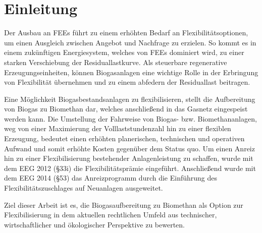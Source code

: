 \section{Einleitung}

Der Ausbau an \glspl{FEE} führt zu einem erhöhten Bedarf an Flexibilitätsoptionen, um einen Ausgleich zwischen Angebot und Nachfrage zu erzielen. So kommt es in einem zukünftigen Energiesystem, welches von \glspl{FEE} dominiert wird, zu einer starken Verschiebung der Residuallastkurve. Als steuerbare regenerative Erzeugungseinheiten, können Biogasanlagen eine wichtige Rolle in der Erbringung von Flexibilität übernehmen und zu einem abfedern der Residuallast beitragen. \parencite{ISE2013}\smallskip

Eine Möglichkeit Biogasbestandsanlagen zu flexibilisieren, stellt die Aufbereitung von Biogas zu Biomethan dar, welches anschließend in das Gasnetz eingespeist werden kann. Die Umstellung der Fahrweise von Biogas- bzw. Biomethananlagen, weg von einer Maximierung der Volllaststundenzahl hin zu einer flexiblen Erzeugung, bedeutet einen erhöhten planerischen, technischen und operativen Aufwand und somit erhöhte Kosten gegenüber dem Status quo. Um einen Anreiz hin zu einer Flexibilisierung bestehender Anlagenleistung zu schaffen, wurde mit dem \gls{EEG} 2012 (\S 33i) die Flexibilitätsprämie eingeführt. Anschließend wurde mit dem \gls{EEG} 2014 (\S 53) das Anreizprogramm durch die Einführung des Flexibilitätszuschlages auf Neuanlagen ausgeweitet. \parencite{DanielGromke2019}\smallskip

Ziel dieser Arbeit ist es, die Biogasaufbereitung zu Biomethan als Option zur Flexibilisierung in dem aktuellen rechtlichen Umfeld aus technischer, wirtschaftlicher und ökologischer Perspektive zu bewerten.